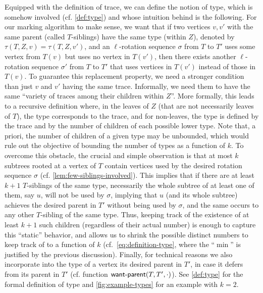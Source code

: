 \documentclass[a4paper,UKenglish,cleveref, autoref, thm-restate]{lipics-v2021}
\newcommand{\wantparent}{{\sf {\sf want{\text -}parent}}\xspace}
\begin{document}
Equipped with the definition of trace, we can define the notion of type, which is somehow involved (cf. \autoref{def:type}) and whose intuition behind is the following. For our marking algorithm to make sense, we want that if two vertices $v,v'$ with the same parent (called $T$-siblings) have the same type (within $Z$), denoted by $\tau(T,Z,v)=\tau(T,Z,v')$, and an $\ell$-rotation sequence $\sigma$ from $T$ to $T'$ uses some vertex from $T(v)$  but uses no vertex in $T(v')$, then there exists another $\ell$-rotation sequence $\sigma'$ from $T$ to $T'$ that uses vertices in $T(v')$ instead of those in $T(v)$. To guarantee this replacement property, we need a stronger condition than just $v$ and $v'$ having the same trace. Informally, we need them to have the same ``variety of traces among their children within $Z$''. More formally, this leads to a recursive definition where, in the leaves of $Z$ (that are not necessarily leaves of $T$), the type corresponds to the trace, and for non-leaves, the type is defined by the trace and by the number of children of each possible lower type. Note that, a priori, the number of children of a given type may be unbounded, which would rule out the objective of bounding the number of types as a function of $k$. To overcome this obstacle, the crucial and simple observation is that at most $k$ subtrees rooted at a vertex of $T$ contain vertices used by the desired rotation sequence $\sigma$ (cf. \autoref{lem:few-siblings-involved}). This implies that if there are at least $k+1$ $T$-siblings of the same type, necessarily the whole subtree of at least one of them, say $u$, will not be used by $\sigma$, implying that $u$ (and its whole subtree) achieves the desired parent in $T'$ without being used by $\sigma$, and the same occurs to any other $T$-sibling of the same type. Thus, keeping track of the existence of at least $k+1$ such children (regardless of their actual number) is enough to capture this
``static'' behavior, and allows us to shrink the possible distinct numbers to keep track of to a function of $k$ (cf.~\autoref{eq:definition-type}, where the ``$\min$'' is justified by the previous discussion). Finally, for technical reasons we also incorporate into the type of a vertex its desired parent in $T'$, in case it defers from its parent in $T'$ (cf. function $\wantparent(T,T',\cdot)$). See \autoref{def:type} for the formal definition of type and \autoref{fig:example-types} for an example with $k=2$.
\end{document}
